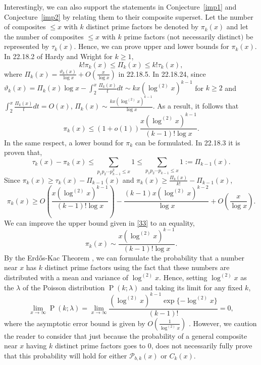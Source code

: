 \documentclass[11pt]{article}
\theoremstyle{plain}
\theoremstyle{definition}
\theoremstyle{remark}
\numberwithin{equation}{subsection}
\begin{document}
\indent Interestingly, we can also support the statements in Conjecture~\ref{imp1} and Conjecture~\ref{imp2} by relating them to their composite superset. Let the number of composites $\le x$ with $k$ distinct prime factors be denoted by $\pi_k(x)$ and let the number of composites $\le x$ with $k$ prime factors $($not necessarily distinct$)$ be represented by $\tau_k(x)$. Hence, we can prove upper and lower bounds for $\pi_k(x)$. In 22.18.2 of Hardy and Wright \cite{7} for $k \ge 1$,
\begin{equation} \label{32}
k!\pi_k(x) \le \Pi_k(x) \le k!\tau_k(x),
\end{equation}
where $\Pi_k(x) = \frac{\vartheta_k(x)}{\log x}+O(\frac{x}{\log x})$ in 22.18.5. In 22.18.24, since $\vartheta_k(x) = \Pi_k(x)\log x - \displaystyle\int_2^x {\frac{\Pi_k(x)}{t}}{dt} \sim kx(\log^{(2)} x)^{k-1}$ for $k \ge 2$ and $\displaystyle\int_2^x {\frac{\Pi_k(x)}{t}}{dt} = O(x)$, $\Pi_k(x) \sim \frac{kx{(\log^{(2)} x)^{k-1}}}{\log x}$. As a result, it follows that
\begin{equation} \label{33}
\pi_k(x) \le (1+o(1))\frac{x(\log^{(2)} x)^{k-1}}{(k-1)!\log x}.
\end{equation}
In the same respect, a lower bound for $\pi_k$ can be formulated. In 22.18.3 it is proven that,
\begin{equation} \label{34}
\tau_k(x)-\pi_k(x)\le\displaystyle\sum_{p_1p_2\cdots p_{k-1}^2\le x}1\le\displaystyle\sum_{p_1p_2\cdots p_{k-1}\le x}1:=\Pi_{k-1}(x).
\end{equation}
Since $\pi_k(x)\ge \tau_k(x) - \Pi_{k-1}(x)$ and $\pi_k(x)\ge \frac{\Pi_k(x)}{k!}-\Pi_{k-1}(x)$,
\begin{equation*}
\pi_k(x)\ge O\left(\frac{x(\log^{(2)} x)^{k-1}}{(k-1)!\log x}\right) - \frac{(k-1)x(\log^{(2)} x)^{k-2}}{\log x} + O\left(\frac{x}{\log x}\right).
\end{equation*}
We can improve the upper bound given in \eqref{33} to an equality,
\begin{equation} \label{36}
\pi_k(x) \sim \frac{x(\log^{(2)} x)^{k-1}}{(k-1)!\log x}.
\end{equation}
By the Erd\H{o}s-Kac Theorem \cite{21}, we can formulate the probability that a number near $x$ has $k$ distinct prime factors using the fact that these numbers are distributed with a mean and variance of $\log^{(2)} x$. Hence, setting $\log^{(2)} x$ as the $\lambda$ of the Poisson distribution $\operatorname P(k;\lambda)$ and taking its limit for any fixed $k$,
\begin{equation} \label{37}
\lim_{x\to\infty} \operatorname P(k;\lambda) = \lim_{x\to\infty}\frac{(\log^{(2)} x)^{k-1}\exp\{-\log^{(2)} x\}}{(k-1)!} = 0,
\end{equation}
where the asymptotic error bound is given by $O(\frac{1}{\log^{(2)} x})$ \cite{13}. However, we caution the reader to consider that just because the probability of a general composite near $x$ having $k$ distinct prime factors goes to $0$, does not necessarily fully prove that this probability will hold for either $\mathscr{P}_{b,k}(x)$ or $C_k (x)$.
\end{document}
